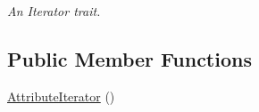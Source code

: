 \begin{DoxyCompactItemize}
\begin{DoxyCompactList}\small\item\em An Iterator trait. \item\end{DoxyCompactList}\end{DoxyCompactItemize}
\subsection*{Public Member Functions}
\begin{DoxyCompactItemize}
\item 
\hypertarget{classphys_1_1xml_1_1AttributeIterator_af2804899f79a9982466acf69b5dd0cab}{
\hyperlink{classphys_1_1xml_1_1AttributeIterator_af2804899f79a9982466acf69b5dd0cab}{AttributeIterator} ()}
\label{de/d78/classphys_1_1xml_1_1AttributeIterator_af2804899f79a9982466acf69b5dd0cab}


\end{DoxyCompactItemize}

